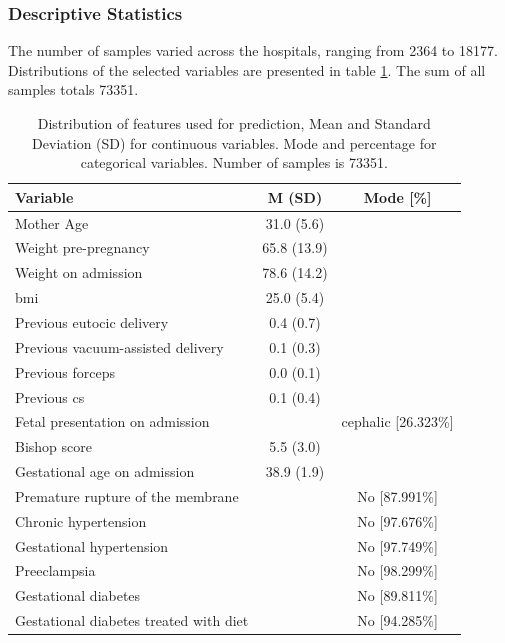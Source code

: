 \subsubsection{Descriptive Statistics}
The number of samples varied across the hospitals, ranging from 2364 to 18177. Distributions of the selected variables are presented in table \ref{tab:obs_material_1}. The sum of all samples totals 73351.

\begin{table}[htbp]
  \centering
  \caption[Distribution of features used for prediction of delivery Type]{Distribution of features used for prediction, Mean and Standard Deviation (SD) for continuous variables. Mode and percentage for categorical variables. Number of samples is 73351.}
  \label{tab:obs_material_1}
   \renewcommand{\arraystretch}{1.02} %
  \setlength{\tabcolsep}{12pt} %
    \begin{tabular}{m{15em}cc}
    \toprule
        Variable & M (SD) & Mode [\%] \\ 
        \hline
        Mother Age & 31.0 (5.6) & ~ \\ 
        Weight pre-pregnancy & 65.8 (13.9) & ~ \\ 
        Weight on admission & 78.6 (14.2) & ~ \\ 
        \ac{bmi} & 25.0 (5.4) & ~ \\ 
        Previous eutocic delivery & 0.4 (0.7) & ~ \\ 
        Previous vacuum-assisted delivery & 0.1 (0.3) & ~ \\ 
        Previous forceps & 0.0 (0.1) & ~ \\ 
        Previous \ac{cs} & 0.1 (0.4) & ~ \\ 
        Fetal presentation on admission & ~ & cephalic [26.323\%] \\ 
        Bishop score & 5.5 (3.0) & ~ \\ 
        Gestational age on admission & 38.9 (1.9) & ~ \\ 
        Premature rupture of the membrane & ~ & No [87.991\%] \\ 
        Chronic hypertension & ~ & No [97.676\%] \\ 
        Gestational hypertension & ~ & No [97.749\%] \\ 
        Preeclampsia & ~ & No [98.299\%] \\ 
        Gestational diabetes & ~ & No [89.811\%] \\ 
        Gestational diabetes treated with diet & ~ & No [94.285\%] \\ 

\end{tabular}
\end{table}

